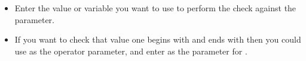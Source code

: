 
\begin{itemize}
\item Enter the value or variable you want to use to perform the check against the  parameter. 
\item  If you want to check that value one begins with  and ends with  then you could use  as the operator parameter, and enter  as the parameter for . 
\end{itemize}
